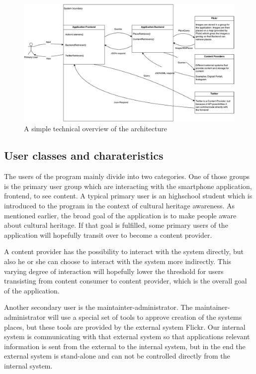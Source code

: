 \begin{figure}[h!]
\begin{center}
\includegraphics[scale=0.6]{tooverview-architecture}
\caption{A simple technical overview of the architecture}
\end{center}
\end{figure}

\subsection{User classes and charateristics}
The users of the program mainly divide into two categories. One of those groups is the primary user group which are interacting with the smartphone application, frontend, to see content. A typical primary user is an highschool student which is introduced to the program in the context of cultural heritage awareness. As mentioned earlier, the broad goal of the application is to make people aware about cultural heritage. If that goal is fulfilled, some primary users of the application will hopefully transit over to become a content provider. 

\noindent

A content provider has the possibility to interact with the system directly, but also he or she can choose to interact with the system more indirectly. This varying degree of interaction will hopefully lower the threshold for users transisting from content consumer to content provider, which is the overall goal of the application. 

\noindent

Another secondary user is the maintainter-administrator. The maintainer-administrator will use a special set of tools to approve creation of the systems places, but these tools are provided by the external system Flickr. Our internal system is communicating with that external system so that applications relevant information is sent from the external to the internal system, but in the end the external system is stand-alone and can not be controlled directly from the internal system. 

